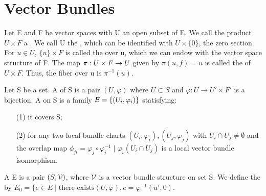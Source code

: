 \section{Vector Bundles}
\begin{definition}
Let E and F be vector spaces with U an open subset of E. We call the product $U\times F$ a . We call U
the , which can be identified with $U\times\{0\}$, the zero section. For $u\in U$, $\{u\}\times F$ is called the
 over u, which we can endow with the vector space structure of F. The map ${\pi}:{U\times F}\rightarrow{U}$ given by $\pi(
u,f)=u$ is called the  of $U\times F$. Thus, the fiber over u is $\pi^{-1}(u)$.
\end{definition}
\begin{definition}
Let S be a set. A  of S is a pair $(U,\varphi)$ where $U\subset S$ and $\varphi:U\rightarrow U'\times F'$
is a bijection. A  on S is a family $\mathcal{B}=\lbrace(U_i,\varphi_i)\rbrace$ statisfying:
\begin{enumerate}
\item[(1)] it covers S;
\item[(2)] for any two local bundle charts $(U_i,\varphi_i),(U_j,\varphi_j)$ with $U_i\cap U_j\neq\emptyset$ and the overlap map
$\phi_{ji}=\varphi_j\circ\varphi_i^{-1}\mid\varphi_i(U_i\cap U_j)$ is a local vector bundle isomorphism.
\end{enumerate}
\end{definition}
A  E is a pair $(S,\mathcal{V})$, where $\mathcal{V}$ is a vector bundle structure on set S. We define the  by $E_0=\lbrace e\in E\mid \text{there exists} (U,\varphi), e=\varphi^{-1}(u',0)$.
